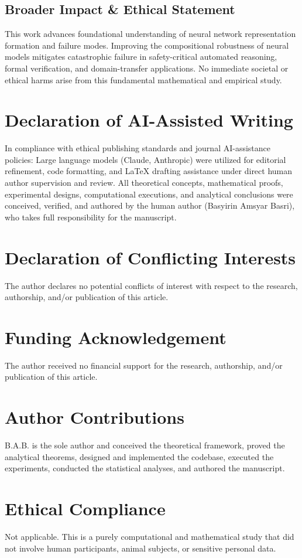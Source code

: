 \documentclass{article}
\theoremstyle{plain}
\theoremstyle{definition}
\begin{document}
\subsection{Broader Impact \& Ethical Statement}
This work advances foundational understanding of neural network representation formation and failure modes. Improving the compositional robustness of neural models mitigates catastrophic failure in safety-critical automated reasoning, formal verification, and domain-transfer applications. No immediate societal or ethical harms arise from this fundamental mathematical and empirical study.

\section*{Declaration of AI-Assisted Writing}
In compliance with ethical publishing standards and journal AI-assistance policies: Large language models (Claude, Anthropic) were utilized for editorial refinement, code formatting, and \LaTeX{} drafting assistance under direct human author supervision and review. All theoretical concepts, mathematical proofs, experimental designs, computational executions, and analytical conclusions were conceived, verified, and authored by the human author (Basyirin Amsyar Basri), who takes full responsibility for the manuscript.

\section*{Declaration of Conflicting Interests}
The author declares no potential conflicts of interest with respect to the research, authorship, and/or publication of this article.

\section*{Funding Acknowledgement}
The author received no financial support for the research, authorship, and/or publication of this article.

\section*{Author Contributions}
B.A.B. is the sole author and conceived the theoretical framework, proved the analytical theorems, designed and implemented the codebase, executed the experiments, conducted the statistical analyses, and authored the manuscript.

\section*{Ethical Compliance}
Not applicable. This is a purely computational and mathematical study that did not involve human participants, animal subjects, or sensitive personal data.
\end{document}
